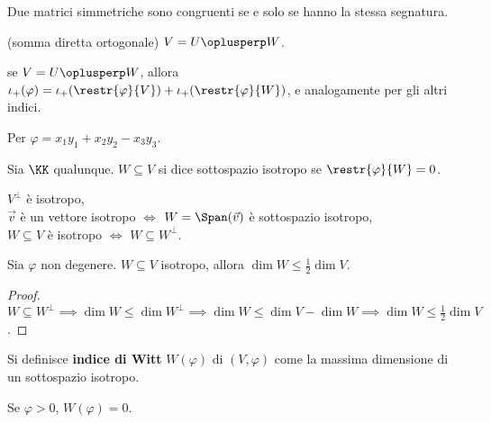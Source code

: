 \documentclass[11pt]{article}
\begin{document}
	\begin{corollary}
		Due matrici simmetriche sono congruenti se e solo se hanno
		la stessa segnatura.
	\end{corollary}

	\begin{definition} (somma diretta ortogonale)
		$V = U \oplusperp W$.
	\end{definition}

	\begin{remark}\nl
		\li se $V = U \oplusperp W$, allora $\iota_+(\varphi) = \iota_+(\restr{\varphi}{V}) + \iota_+(\restr{\varphi}{W})$, e
		analogamente per gli altri indici.
	\end{remark}

	\begin{example}
		Per $\varphi = x_1 y_1 + x_2 y_2 - x_3 y_3$. %
	\end{example}

	\begin{definition}
		Sia $\KK$ qualunque. $W \subseteq V$ si dice sottospazio isotropo
		se $\restr{\varphi}{W} = 0$.
	\end{definition}

	\begin{remark}\nl
		\li $V^\perp$ è isotropo, \\
		\li $\vec{v}$ è un vettore isotropo $\iff$ $W = \Span(\vec v)$ è sottospazio isotropo, \\
		\li $W \subseteq V$ è isotropo $\iff$ $W \subseteq W^\perp$.
	\end{remark}

	\begin{proposition}
		Sia $\varphi$ non degenere. $W \subseteq V$ isotropo, allora
		$\dim W \leq \frac{1}{2} \dim V$.
	\end{proposition}

	\begin{proof}
		$W \subseteq W^\perp \implies \dim W \leq \dim W^\perp \implies
		\dim W \leq \dim V - \dim W \implies \dim W \leq \frac{1}{2} \dim V$.
	\end{proof}

	\begin{definition}
		Si definisce \textbf{indice di Witt} $W(\varphi)$ di $(V, \varphi)$
		come la massima dimensione di un sottospazio isotropo. 
	\end{definition}

	\begin{remark}\nl
		\li Se $\varphi > 0$, $W(\varphi) = 0$.
	\end{remark}
\end{document}
